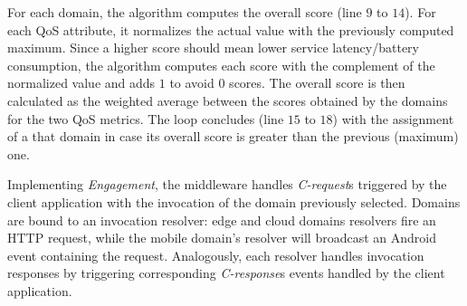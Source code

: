 For each domain, the algorithm computes the overall score (line $9$ to $14$). For each QoS attribute, it normalizes the actual value with the previously computed maximum.
Since a higher score should mean lower service latency/battery consumption, the algorithm computes each score with the complement of the normalized value and adds $1$ to avoid $0$ scores. 
The overall score is then calculated as the weighted average between the scores obtained by the domains for the two QoS metrics. The loop concludes (line $15$ to $18$) with the assignment of a that domain in case its overall score is greater than the previous (maximum) one.  

%


Implementing \textit{Engagement}, the middleware handles \textit{C-request}s triggered by the client application 
with the invocation of the domain previously selected. Domains are bound to an invocation resolver: edge and cloud domains resolvers fire an HTTP request, while the mobile domain's resolver will broadcast an Android event containing the request. Analogously, each resolver handles invocation responses by triggering corresponding \textit{C-response}s events handled by the client application.
